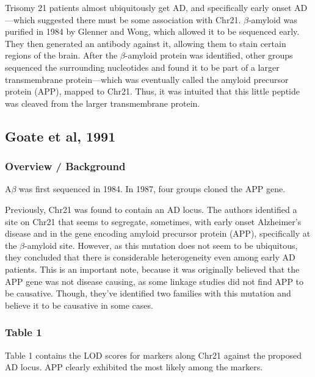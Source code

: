 \documentclass[12pt]{report}
\newcommand{\be}{\beta}
\begin{document}
Trisomy 21 patients almost ubiquitously get AD, and specifically early onset AD---which suggested there must be some association with Chr21. $\beta$-amyloid was purified in 1984 by Glenner and Wong, which allowed it to be sequenced early. They then generated an antibody against it, allowing them to stain certain regions of the brain. After the $\beta$-amyloid protein was identified, other groups sequenced the surrounding nucleotides and found it to be part of a larger transmembrane protein---which was eventually called the amyloid precursor protein (APP), mapped to Chr21. Thus, it was intuited that this little peptide was cleaved from the larger transmembrane protein. 


\subsection*{Goate et al, 1991} 

\subsubsection*{Overview / Background}

A$\be$ was first sequenced in 1984. In 1987, four groups cloned the APP gene.\newline

Previously, Chr21 was found to contain an AD locus. The authors identified a site on Chr21 that seems to segregate, sometimes, with early onset Alzheimer's disease and in the gene encoding amyloid precursor protein (APP), specifically at the $\beta$-amyloid site. However, as this mutation does not seem to be ubiquitous, they concluded that there is considerable heterogeneity even among early AD patients. This is an important note, because it was originally believed that the APP gene was not disease causing, as some linkage studies did not find APP to be causative. Though, they've identified two families with this mutation and believe it to be causative in some cases.\newline

\subsubsection*{Table 1} Table 1 contains the LOD scores for markers along Chr21 against the proposed AD locus. APP clearly exhibited the most likely among the markers. 
\end{document}
